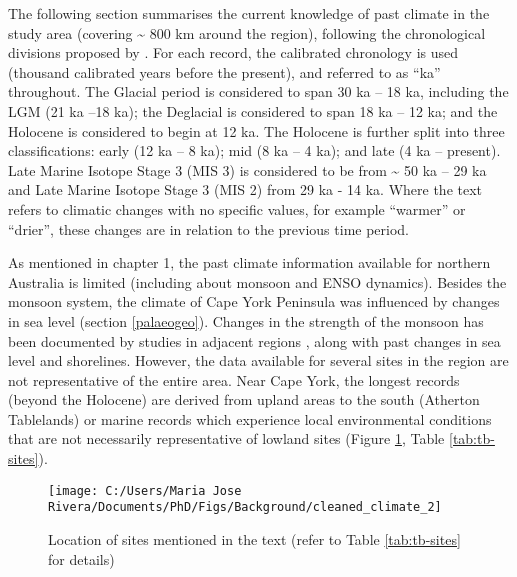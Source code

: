 \documentclass[
  12pt,
]{book}
\begin{document}
The following section summarises the current knowledge of past climate in the study area (covering \textasciitilde{} 800 km around the region), following the chronological divisions proposed by \citet{reevesPalaeoenvironmentalChangeTropical2013}. For each record, the calibrated chronology is used (thousand calibrated years before the present), and referred to as ``ka'' throughout. The Glacial period is considered to span 30 ka -- 18 ka, including the LGM (21 ka --18 ka); the Deglacial is considered to span 18 ka -- 12 ka; and the Holocene is considered to begin at 12 ka. The Holocene is further split into three classifications: early (12 ka -- 8 ka); mid (8 ka -- 4 ka); and late (4 ka -- present). Late Marine Isotope Stage 3 (MIS 3) is considered to be from \textasciitilde{} 50 ka -- 29 ka and Late Marine Isotope Stage 3 (MIS 2) from 29 ka - 14 ka. Where the text refers to climatic changes with no specific values, for example ``warmer'' or ``drier'', these changes are in relation to the previous time period.

As mentioned in chapter 1, the past climate information available for northern Australia is limited (including about monsoon and ENSO dynamics). Besides the monsoon system, the climate of Cape York Peninsula was influenced by changes in sea level (section \ref{palaeogeo}). Changes in the strength of the monsoon has been documented by studies in adjacent regions \citep{jiangConceptGlobalMonsoon2015, dennistonDecouplingMonsoonActivity2017, yanUnderstandingAustralianMonsoon2018}, along with past changes in sea level and shorelines. However, the data available for several sites in the region are not representative of the entire area. Near Cape York, the longest records (beyond the Holocene) are derived from upland areas to the south (Atherton Tablelands) or marine records which experience local environmental conditions that are not necessarily representative of lowland sites \citep{shulmeisterPollenEvidenceTropical1995} (Figure \ref{fig:fig-climate}, Table \ref{tab:tb-sites}).

\begin{figure}

{\centering \texttt{[image: C:/Users/Maria Jose Rivera/Documents/PhD/Figs/Background/cleaned\_climate\_2]} 

}

\caption{Location of sites mentioned in the text (refer to Table \ref{tab:tb-sites} for details)}\label{fig:fig-climate}
\end{figure}
\end{document}
